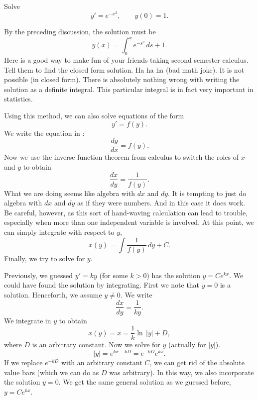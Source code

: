 \begin{example}
Solve
\begin{equation*}
y' = e^{-x^2}, \qquad y(0) = 1 .
\end{equation*}

By the preceding discussion, the solution must be
\begin{equation*}
y(x) = \int_0^x e^{-s^2} \,ds + 1 .
\end{equation*}
Here is a good way to make fun of your friends taking second semester
calculus.  Tell them to
find the closed form solution.  Ha ha ha (bad math joke).  It is
not possible (in closed form).
There is absolutely nothing wrong with writing the solution as a
definite integral.
This particular integral
is in fact very important
in statistics.
\end{example}

Using this method, we can also solve equations of the form
\begin{equation*}
y' = f(y) .
\end{equation*}
We write the equation in :
\begin{equation*}
\frac{dy}{dx} = f(y) .
\end{equation*}
Now we use the inverse function theorem from calculus
to switch the roles of $x$ and $y$
to obtain
\begin{equation*}
\frac{dx}{dy} = \frac{1}{f(y)} .
\end{equation*}
What
we are doing seems like algebra with $dx$ and $dy$.
It is tempting to just do algebra with $dx$
and $dy$ as if they were numbers.  And in this case it does work.  Be
careful,
however, as this sort of hand-waving calculation can lead to trouble,
especially when
more than one independent variable is involved.
At this point, we can simply integrate with respect to $y$,
\begin{equation*}
x(y) = \int \frac{1}{f(y)} \,dy + C .
\end{equation*}
Finally, we try to solve for $y$.

\begin{example}
Previously, we guessed $y' = ky$ (for some $k > 0$) has the solution
$y=Ce^{kx}$.  We could have found the solution by integrating.
First we note that $y=0$ is a solution.
Henceforth, we assume $y\not= 0$.  We write
\begin{equation*}
\frac{dx}{dy} = \frac{1}{ky} .
\end{equation*}
We integrate in $y$ to obtain
\begin{equation*}
x(y) = x = \frac{1}{k} \ln \, \lvert y \rvert + D,
\end{equation*}
where $D$ is an arbitrary constant.
Now we solve for $y$ (actually for $\lvert y \rvert$).
\begin{equation*}
\lvert y \rvert =
e^{kx-kD} = 
e^{-kD} e^{k x} .
\end{equation*}
If we replace $e^{-kD}$ with an arbitrary constant $C$, we can
get rid of the absolute value bars (which we can do as $D$ was arbitrary).  In
this way, we
also incorporate the solution $y=0$.  We get the same general solution as
we guessed before, $y = Ce^{kx}$.
\end{example}

